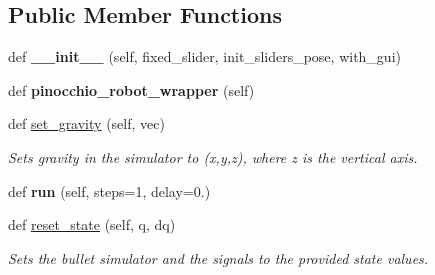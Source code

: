 \subsection*{Public Member Functions}
\begin{DoxyCompactItemize}
\item 
def {\bfseries \+\_\+\+\_\+init\+\_\+\+\_\+} (self, fixed\+\_\+slider, init\+\_\+sliders\+\_\+pose, with\+\_\+gui)\hypertarget{classdg__blmc__robots_1_1teststand_1_1teststand__bullet_1_1TeststandBulletRobot_aed7733bebc63fa65d527ae2bfe133b9a}{}\label{classdg__blmc__robots_1_1teststand_1_1teststand__bullet_1_1TeststandBulletRobot_aed7733bebc63fa65d527ae2bfe133b9a}

\item 
def {\bfseries pinocchio\+\_\+robot\+\_\+wrapper} (self)\hypertarget{classdg__blmc__robots_1_1teststand_1_1teststand__bullet_1_1TeststandBulletRobot_a4062815d510c246c8a9b7b38b11f8fbc}{}\label{classdg__blmc__robots_1_1teststand_1_1teststand__bullet_1_1TeststandBulletRobot_a4062815d510c246c8a9b7b38b11f8fbc}

\item 
def \hyperlink{classdg__blmc__robots_1_1teststand_1_1teststand__bullet_1_1TeststandBulletRobot_a961e8a9d4f6cc368503cf0923eb80940}{set\+\_\+gravity} (self, vec)
\begin{DoxyCompactList}\small\item\em Sets gravity in the simulator to (x,y,z), where z is the vertical axis. \end{DoxyCompactList}\item 
def {\bfseries run} (self, steps=1, delay=0.)\hypertarget{classdg__blmc__robots_1_1teststand_1_1teststand__bullet_1_1TeststandBulletRobot_a64326376acc832babc838f6d0f2499e8}{}\label{classdg__blmc__robots_1_1teststand_1_1teststand__bullet_1_1TeststandBulletRobot_a64326376acc832babc838f6d0f2499e8}

\item 
def \hyperlink{classdg__blmc__robots_1_1teststand_1_1teststand__bullet_1_1TeststandBulletRobot_acbb1f3051c8d20cd8fec0126f3b93246}{reset\+\_\+state} (self, q, dq)
\begin{DoxyCompactList}\small\item\em Sets the bullet simulator and the signals to the provided state values. \end{DoxyCompactList}\end{DoxyCompactItemize}
